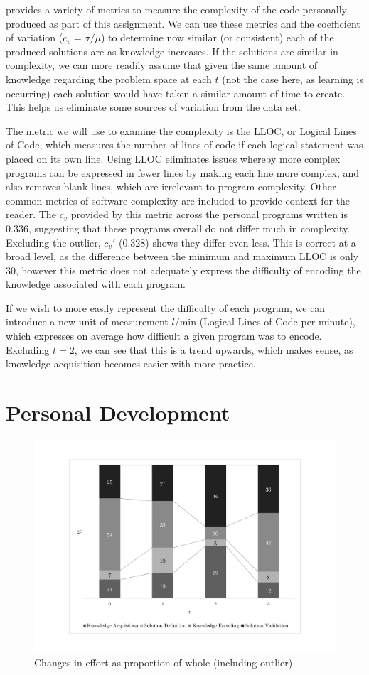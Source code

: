 \documentclass[a4paper,10pt]{article}
\begin{document}
 provides a variety of metrics to measure the complexity of the code personally produced as part of this assignment. We can use these metrics and the coefficient of variation ($c_v = \sigma/\mu$) to determine now similar (or consistent) each of the produced solutions are as knowledge increases. If the solutions are similar in complexity, we can more readily assume that given the same amount of knowledge regarding the problem space at each $t$ (not the case here, as learning is occurring) each solution would have taken a similar amount of time to create. This helps us eliminate some sources of variation from the data set.

The metric we will use to examine the complexity is the LLOC, or Logical Lines of Code, which measures the number of lines of code if each logical statement was placed on its own line. Using LLOC eliminates issues whereby more complex programs can be expressed in fewer lines by making each line more complex, and also removes blank lines, which are irrelevant to program complexity. Other common metrics of software complexity are included to provide context for the reader. The $c_v$ provided by this metric across the personal programs written is 0.336, suggesting that these programs overall do not differ much in complexity. Excluding the outlier, $c_v'$ (0.328) shows they differ even less. This is correct at a broad level, as the difference between the minimum and maximum LLOC is only 30, however this metric does not adequately express the difficulty of encoding the knowledge associated with each program. 

If we wish to more easily represent the difficulty of each program, we can introduce a new unit of measurement $l$/min (Logical Lines of Code per minute), which expresses on average how difficult a given program was to encode. Excluding $t=2$, we can see that this is a trend upwards, which makes sense, as knowledge acquisition becomes easier with more practice.

\section{Personal Development}
\begin{figure}
\centering
\includegraphics[height=0.65\textwidth]{graphs/percentage2.pdf}
\caption{Changes in effort as proportion of whole (including outlier)}
\label{fig:effort1}
\end{figure}
\end{document}
